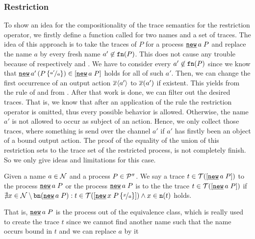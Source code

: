 \subsubsection{Restriction}
\label{sec_comp_res}
To show an idea for the compositionality of the trace semantics for the restriction operator, we firstly define a function called  for two names and a set of traces. The idea of this approach is to take the traces of $P$ for a process $\procres{a}{P}$ and replace the name $a$ by every fresh name $a'\not\in\mathtt{fn}(P)$. This does not cause any trouble because of  respectively  and . We have to consider every $a'\not\in\mathtt{fn}(P)$ since we know that $\procres[()]{a'}{P\subs{a'}{a}}\in\ec{\procres{a}{P}}$ holds for all of such $a'$. Then, we can change the first occurrence of an output action $\overline{x}\langle a'\rangle$ to $\overline{x}(a')$ if existent. This yields from the \eopen{} rule of  and from . After that work is done, we can filter out the desired traces. That is, we know that after an application of the \eopen{} rule the restriction operator is omitted, thus every possible behavior is allowed. Otherwise, the name $a'$ is not allowed to occur as subject of an action. Hence, we only collect those traces, where something is send over the channel $a'$ if $a'$ has firstly been an object of a bound output action. The proof of the equality of the union of this restriction sets to the trace set of the restricted process, is not completely finish. So we only give ideas and limitations for this case.  %

\begin{old}[Old trace association which does not hold] %
\begin{definition}
\label{def_trace_belonging}
Given a name $a\in\mathcal N$ and a process $P\in\mathcal P^{\pi}$. We say a trace $t\in\traces[\procres{a}{P}]$  to the process $\procres{a}{P}$ or the process $\procres{a}{P}$ is  to the the trace $t\in\traces[\procres{a}{P}]$ if $\nexists{}x\in\names\setminus\bn{\procres{a}{P}}: t\in\traces[\procres{x}{P\subs{x}{a}}] \wedge x\in\n{t}$ holds.
\end{definition}
That is, $\procres{a}{P}$ is the process out of the equivalence class, which is really used to create the trace $t$ since we cannot find another name such that the name occurs bound in $t$ and we can replace $a$ by it  
\end{old} %

